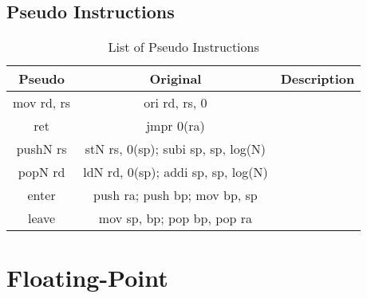 \documentclass{article}
\begin{document}
    
    \subsection{Pseudo Instructions}
    
    \begin{center}
    \begin{longtable}{|c|c|c|}
    \caption{List of Pseudo Instructions}
    \label{table:pseudo_instr} \\

    \hline Pseudo           &   Original    &   Description \\

    \hline mov rd, rs       &   ori rd, rs, 0                           & \\
    \hline ret              &   jmpr 0(ra)                              & \\
    \hline pushN rs         &   stN rs, 0(sp); subi sp, sp, log(N)      & \\
    \hline popN rd          &   ldN rd, 0(sp); addi sp, sp, log(N)      & \\
    \hline enter            &   push ra; push bp; mov bp, sp            & \\
    \hline leave            &   mov sp, bp; pop bp, pop ra              & \\
            
    \hline
    \end{longtable}
    \end{center}

\section{Floating-Point}
\end{document}
